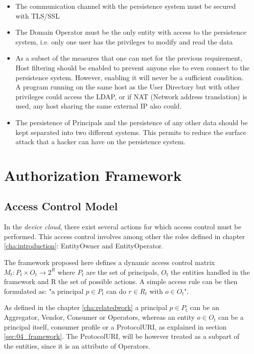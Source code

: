 \label{LDAP_security}
\begin{itemize}
	\item The communication channel with the persistence system must be secured with TLS/SSL
	\item The Domain Operator must be the only entity with access to the persistence system, i.e. only one user has the privileges to modify and read the data
	\item As a subset of the measures that one can met for the previous requirement, Host filtering should be enabled to prevent anyone else to even connect to the persistence system. However, enabling it will never be a sufficient condition. A program running on the same host as the User Directory but with other privileges could access the LDAP, or if NAT (Network address translation) is used, any host sharing the same external IP also could.
	\item The persistence of Principals and the persistence of any other data should be kept separated into two different systems. This permits to reduce the surface attack that a hacker can have on the persistence system.
\end{itemize}

\section{Authorization Framework}
\label{03_authorizing}

\subsection{Access Control Model}

In the \emph{device cloud}, there exist several actions for which access control must be performed. This access control involves among other the roles defined in chapter \ref{cha:introduction}: EntityOwner and EntityOperator.

The framework proposed here defines a dynamic access control matrix $ M_{t}:  P_{t} \times O_{t} \rightarrow 2^{R}$ where $P_{t}$ are the set of principals,  $O_{t}$ the entities handled in the framework and R the set of possible actions. A simple access rule can be then formulated as: "a principal $p \in P_{t}$ can do $r \in R_{t}$ with $o \in O_{t}$".

As defined in the chapter \ref{cha:relatedwork} a principal $p \in P_{t}$ can be an Aggregator, Vendor, Consumer or Operators, whereas an entity $o \in O_{t}$ can be a principal itself, consumer profile or a ProtocolURI, as explained in section \ref{sec:04_framework}. The ProtocolURI, will be however treated as a subpart of the entities, since it is an attribute of Operators. 


